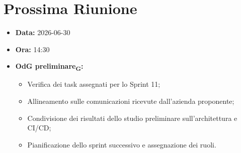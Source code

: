 \section{Prossima Riunione}
\begin{itemize}
	\item \textbf{Data:} 2026-06-30
	\item \textbf{Ora:} 14:30
	\item \textbf{OdG preliminare\textsubscript{G}:}
	\begin{itemize}
		\item Verifica dei task assegnati per lo Sprint 11;
		\item Allineamento sulle comunicazioni ricevute dall'azienda proponente;
		\item Condivisione dei risultati dello studio preliminare sull'architettura e CI/CD;
		\item Pianificazione dello sprint successivo e assegnazione dei ruoli.
	\end{itemize}
\end{itemize}

